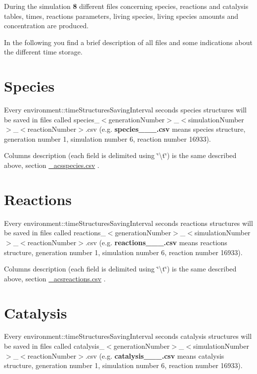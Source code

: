 During the simulation {\bfseries 8} different files concerning species, reactions and catalysis tables, times, reactions parameters, living species, living species amounts and concentration are produced.

In the following you find a brief description of all files and some indications about the different time storage. \hypertarget{a00006_outspecies}{}\section{Species}\label{a00006_outspecies}
Every environment\-::time\-Structures\-Saving\-Interval seconds species structures will be saved in files called species\-\_\-$<$generation\-Number$>$\-\_\-$<$simulation\-Number$>$\-\_\-$<$reaction\-Number$>$.\-csv (e.\-g. {\bfseries species\-\_\-\_\-\_.\-csv} means species structure, generation number 1, simulation number 6, reaction number 16933).\par
Columns description (each field is delimited using \char`\"{}\textbackslash{}t\char`\"{}) is the same described above, section \hyperlink{a00004_subSpecies}{\-\_\-acsspecies.\-csv} .\hypertarget{a00006_outreactions}{}\section{Reactions}\label{a00006_outreactions}
Every environment\-::time\-Structures\-Saving\-Interval seconds reactions structures will be saved in files called reactions\-\_\-$<$generation\-Number$>$\-\_\-$<$simulation\-Number$>$\-\_\-$<$reaction\-Number$>$.\-csv (e.\-g. {\bfseries reactions\-\_\-\_\-\_.\-csv} means reactions structure, generation number 1, simulation number 6, reaction number 16933). \par
Columns description (each field is delimited using \char`\"{}\textbackslash{}t\char`\"{}) is the same described above, section \hyperlink{a00004_subReactions}{\-\_\-acsreactions.\-csv} .\hypertarget{a00006_outcatalysis}{}\section{Catalysis}\label{a00006_outcatalysis}
Every environment\-::time\-Structures\-Saving\-Interval seconds catalysis structures will be saved in files called catalysis\-\_\-$<$generation\-Number$>$\-\_\-$<$simulation\-Number$>$\-\_\-$<$reaction\-Number$>$.\-csv (e.\-g. {\bfseries catalysis\-\_\-\_\-\_.\-csv} means catalysis structure, generation number 1, simulation number 6, reaction number 16933). \par
